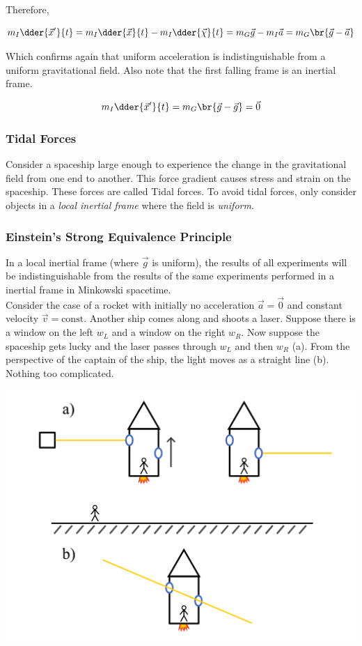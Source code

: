\documentclass{article}
\begin{document}
Therefore,

\[ m_I \dder{\vec{x}'}{t} = m_I \dder{\vec{x}}{t} - m_I \dder{\vec{\chi}}{t} = m_G \vec{g} - m_I \vec{a} = m_G \br{\vec{g} - \vec{a}} \]

Which confirms again that uniform acceleration is indistinguishable from a uniform gravitational field. Also note that the first falling frame is an inertial frame.

\[ m_I \dder{\vec{x}'}{t} = m_G\br{\vec{g} - \vec{g}} = \vec{0} \]

\subsubsection{Tidal Forces}

Consider a spaceship large enough to experience the change in the gravitational field from one end to another. This force gradient causes stress and strain on the spaceship. These forces are called Tidal forces. To avoid tidal forces, only consider objects in a \textit{local inertial frame} where the field is \textit{uniform}.

\subsubsection{Einstein's Strong Equivalence Principle}

In a local inertial frame (where $\vec{g}$ is uniform), the results of all experiments will be indistinguishable from the results of the same experiments performed in a inertial frame in Minkowski spacetime.\\

Consider the case of a rocket with initially no acceleration $\vec{a} = \vec{0}$ and constant velocity $\vec{v} = \text{const}$. Another ship comes along and shoots a laser. Suppose there is a window on the left $w_L$ and a window on the right $w_R$. Now suppose the spaceship gets lucky and the laser passes through $w_L$ and then $w_R$ (a). From the perspective of the captain of the ship, the light moves as a straight line (b). Nothing too complicated. \\

\begin{center}
    \includegraphics[scale=0.7]{figures/bend_light/constant_v.pdf}
\end{center}
\end{document}
